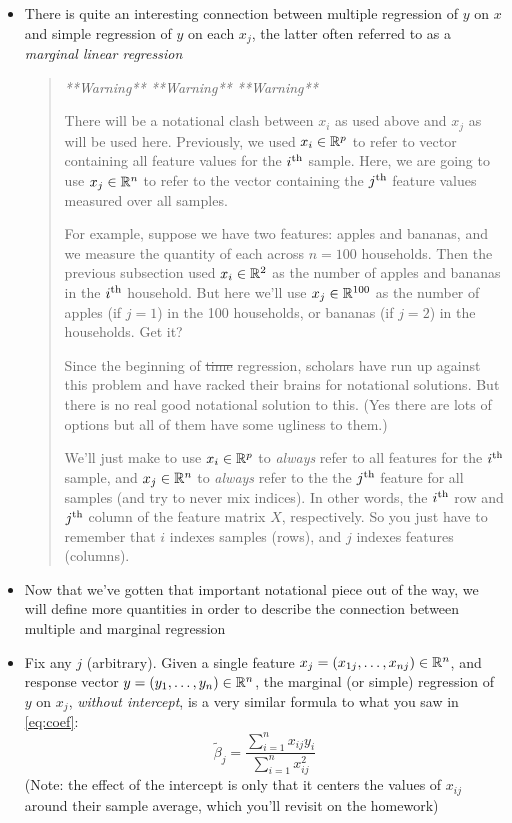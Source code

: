 \documentclass{article}
\begin{document}
\begin{itemize}
\item There is quite an interesting connection between multiple regression of
  $y$ on $x$ and simple regression of $y$ on each $x_j$, the latter often
  referred to as a \emph{marginal linear regression}

\begin{quote}\it
**Warning** **Warning** **Warning**

There will be a notational clash between $x_i$ as used above and $x_j$ as will
be used here. Previously, we used $x_i \in \mathbb{R}^p$ to refer to vector containing
all feature values for the $i^{\textnormal{th}}$ sample. Here, we are going to use $x_j \in
\mathbb{R}^n$ to refer to the vector containing the $j^{\textnormal{th}}$ feature values measured over
all samples.       

For example, suppose we have two features: apples and bananas, and we measure
the quantity of each across $n = 100$ households. Then the previous subsection
used $x_i \in \mathbb{R}^2$ as the number of apples and bananas in the $i^{\textnormal{th}}$
household. But here we'll use $x_j \in \mathbb{R}^{100}$ as the number of apples (if
$j=1$) in the 100 households, or bananas (if $j=2$) in the households. Get it? 

Since the beginning of \sout{time} regression, scholars have run up against this
problem and have racked their brains for notational solutions. But there is no
real good notational solution to this. (Yes there are lots of options but all of
them have some ugliness to them.)

We'll just make to use $x_i \in \mathbb{R}^p$ to \emph{always} refer to all features for
the $i^{\textnormal{th}}$ sample, and $x_j \in \mathbb{R}^n$ to \emph{always} refer to the the $j^{\textnormal{th}}$
feature for all samples (and try to never mix indices). In other words, the
$i^{\textnormal{th}}$ row and $j^{\textnormal{th}}$ column of the feature matrix $X$, respectively. So you
just have to remember that $i$ indexes samples (rows), and $j$ indexes features
(columns). 
\end{quote}

\item Now that we've gotten that important notational piece out of the way, we
  will define more quantities in order to describe the connection between
  multiple and marginal regression

\item Fix any $j$ (arbitrary). Given a single feature $x_j = (x_{1j}, \dots,
  x_{nj}) \in \mathbb{R}^n$, and response vector $y = (y_1, \dots, y_n) \in \mathbb{R}^n$, the 
  marginal (or simple) regression of $y$ on $x_j$, \emph{without intercept}, is
  a very similar formula to what you saw in \eqref{eq:coef}:
  \[
  \tilde\beta_j = \frac{\sum_{i=1}^n x_{ij} y_i}{\sum_{i=1}^n x_{ij}^2} 
  \]
  (Note: the effect of the intercept is only that it centers the values of
  $x_{ij}$ around their sample average, which you'll revisit on the homework)    


\end{itemize}
\end{document}
